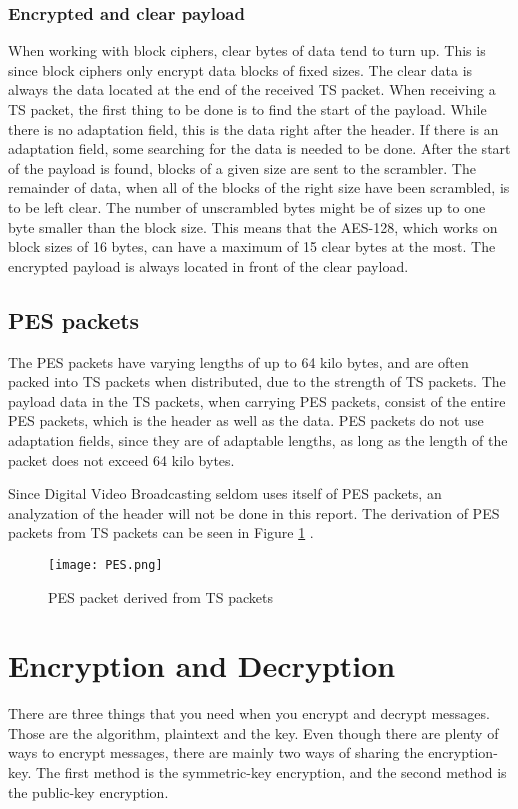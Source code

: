 \subsubsection{Encrypted and clear payload}
When working with block ciphers, clear bytes of data tend to turn up. 
This is since block ciphers only encrypt data blocks of fixed sizes. 
The clear data is always the data located at the end of the received TS 
packet. When receiving a TS packet, the first thing to be done is to 
find the start of the payload. While there is no adaptation field, this 
is the data right after the header. If there is an adaptation field, 
some searching for the data is needed to be done. After the start of 
the payload is found, blocks of a given size are sent to the scrambler.
The remainder of data, when all of the blocks of the right size have 
been scrambled, is to be left clear. The number of unscrambled bytes 
might be of sizes up to one byte smaller than the block size. This 
means that the AES-128, which works on block sizes of 16 bytes, can 
have a maximum of 15 clear bytes at the most. The encrypted payload is 
always located in front of the clear payload. 
\cite[pp. 10--11]{DVB:2013}

\subsection{PES packets}
The PES packets have varying lengths of up to 64 kilo bytes, and are 
often packed into TS packets when distributed, due to the strength of 
TS packets. The payload data in the TS packets, when carrying PES 
packets, consist of the entire PES packets, which is the header as well 
as the data. PES packets do not use adaptation fields, since they are 
of adaptable lengths, as long as the length of the packet does not 
exceed 64 kilo bytes.

Since Digital Video Broadcasting seldom uses itself of PES packets, an 
analyzation of the header will not be done in this report. The 
derivation of PES packets from TS packets can be seen in Figure 
\ref{img:PES} \citep[p. 9]{ETR:289}.

\begin{figure}[h!]
  \texttt{[image: PES.png]}
  \caption{PES packet derived from TS packets}
  \label{img:PES}
\end{figure}

\section{Encryption and Decryption}
There are three things that you need when you encrypt and decrypt 
messages. Those are the algorithm, plaintext and the key. Even though 
there are plenty of ways to encrypt messages, there are mainly two ways 
of sharing the encryption-key. The first method is the symmetric-key 
encryption, and the second method is the public-key encryption. 
